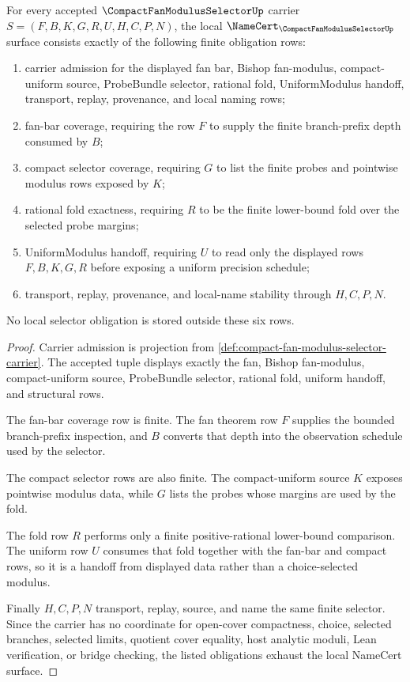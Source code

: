 \begin{theorem}
\label{thm:compact-fan-modulus-selector-namecert-obligations}
For every accepted $\CompactFanModulusSelectorUp$ carrier $S=(F,B,K,G,R,U,H,C,P,N)$, the local $\NameCert_{\CompactFanModulusSelectorUp}$ surface consists exactly of the following finite obligation rows:
\begin{enumerate}
\item carrier admission for the displayed fan bar, Bishop fan-modulus, compact-uniform source, ProbeBundle selector, rational fold, UniformModulus handoff, transport, replay, provenance, and local naming rows;
\item fan-bar coverage, requiring the row $F$ to supply the finite branch-prefix depth consumed by $B$;
\item compact selector coverage, requiring $G$ to list the finite probes and pointwise modulus rows exposed by $K$;
\item rational fold exactness, requiring $R$ to be the finite lower-bound fold over the selected probe margins;
\item UniformModulus handoff, requiring $U$ to read only the displayed rows $F,B,K,G,R$ before exposing a uniform precision schedule;
\item transport, replay, provenance, and local-name stability through $H,C,P,N$.
\end{enumerate}
No local selector obligation is stored outside these six rows.
\end{theorem}
\begin{proof}
Carrier admission is projection from \autoref{def:compact-fan-modulus-selector-carrier}. The accepted tuple displays exactly the fan, Bishop fan-modulus, compact-uniform source, ProbeBundle selector, rational fold, uniform handoff, and structural rows.

The fan-bar coverage row is finite. The fan theorem row $F$ supplies the bounded branch-prefix inspection, and $B$ converts that depth into the observation schedule used by the selector.

The compact selector rows are also finite. The compact-uniform source $K$ exposes pointwise modulus data, while $G$ lists the probes whose margins are used by the fold.

The fold row $R$ performs only a finite positive-rational lower-bound comparison. The uniform row $U$ consumes that fold together with the fan-bar and compact rows, so it is a handoff from displayed data rather than a choice-selected modulus.

Finally $H,C,P,N$ transport, replay, source, and name the same finite selector. Since the carrier has no coordinate for open-cover compactness, choice, selected branches, selected limits, quotient cover equality, host analytic moduli, Lean verification, or bridge checking, the listed obligations exhaust the local NameCert surface.
\end{proof}


